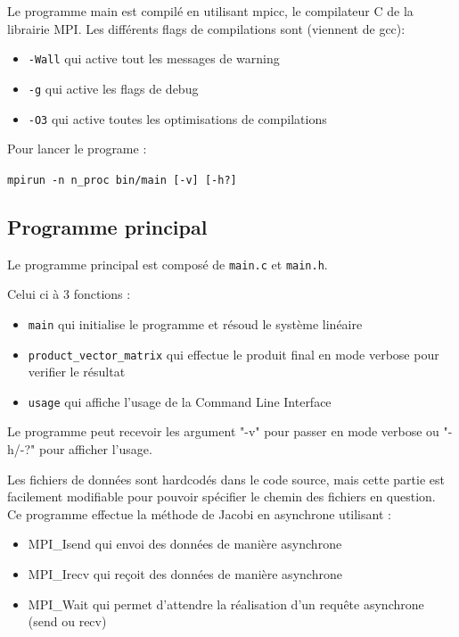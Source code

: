 \documentclass[11pt, a4paper]{article}
\begin{document}
Le programme main est compilé en utilisant mpicc, le compilateur C de la librairie MPI. Les différents flags de compilations sont (viennent de gcc): 

\begin{itemize}
    \item \texttt{-Wall} qui active tout les messages de warning
    \item \texttt{-g} qui active les flags de debug
    \item \texttt{-O3} qui active toutes les optimisations de compilations
\end{itemize}

Pour lancer le programe : 

\texttt{mpirun -n n\_proc bin/main [-v] [-h?]}

\subsection{Programme principal}

Le programme principal est composé de \texttt{main.c} et \texttt{main.h}.

Celui ci à 3 fonctions :
\begin{itemize}
    \item \texttt{main} qui initialise le programme et résoud le système linéaire
    \item \texttt{product\_vector\_matrix} qui effectue le produit final en mode verbose pour verifier le résultat
    \item \texttt{usage} qui affiche l'usage de la Command Line Interface
\end{itemize}

Le programme peut recevoir les argument "-v" pour passer en mode verbose ou "-h/-?" pour afficher l'usage.

Les fichiers de données sont hardcodés dans le code source, mais cette partie est facilement modifiable pour pouvoir spécifier le chemin des fichiers en question.\\

Ce programme effectue la méthode de Jacobi en asynchrone utilisant :

\begin{itemize}
    \item MPI\_Isend qui envoi des données de manière asynchrone 
    \item MPI\_Irecv qui reçoit des données de manière asynchrone
    \item MPI\_Wait qui permet d'attendre  la réalisation d'un requ\^ete asynchrone (send ou recv)\\
\end{itemize}
\end{document}
